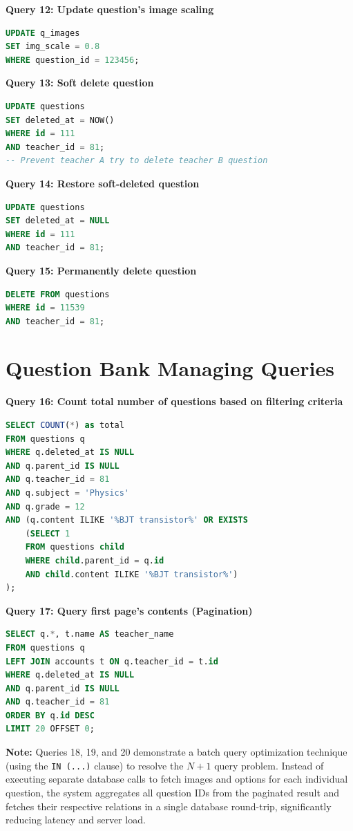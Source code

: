 \documentclass[../report_main.tex]{subfiles}
\begin{document}
\textbf{Query 12: Update question's image scaling}
\begin{lstlisting}[language=SQL]
UPDATE q_images 
SET img_scale = 0.8 
WHERE question_id = 123456;
\end{lstlisting}

\textbf{Query 13: Soft delete question}
\begin{lstlisting}[language=SQL]
UPDATE questions 
SET deleted_at = NOW() 
WHERE id = 111 
AND teacher_id = 81; 
-- Prevent teacher A try to delete teacher B question
\end{lstlisting}

\textbf{Query 14: Restore soft-deleted question}
\begin{lstlisting}[language=SQL]
UPDATE questions 
SET deleted_at = NULL 
WHERE id = 111 
AND teacher_id = 81;
\end{lstlisting}

\textbf{Query 15: Permanently delete question}
\begin{lstlisting}[language=SQL]
DELETE FROM questions 
WHERE id = 11539 
AND teacher_id = 81;
\end{lstlisting}


\section{Question Bank Managing Queries}

\textbf{Query 16: Count total number of questions based on filtering criteria}
\begin{lstlisting}[language=SQL]
SELECT COUNT(*) as total 
FROM questions q 
WHERE q.deleted_at IS NULL 
AND q.parent_id IS NULL 
AND q.teacher_id = 81 
AND q.subject = 'Physics' 
AND q.grade = 12 
AND (q.content ILIKE '%BJT transistor%' OR EXISTS 
    (SELECT 1 
    FROM questions child 
    WHERE child.parent_id = q.id 
    AND child.content ILIKE '%BJT transistor%')
);
\end{lstlisting}

\textbf{Query 17: Query first page's contents (Pagination)}
\begin{lstlisting}[language=SQL]
SELECT q.*, t.name AS teacher_name
FROM questions q
LEFT JOIN accounts t ON q.teacher_id = t.id
WHERE q.deleted_at IS NULL 
AND q.parent_id IS NULL 
AND q.teacher_id = 81
ORDER BY q.id DESC 
LIMIT 20 OFFSET 0;
\end{lstlisting}

\textbf{Note:} Queries 18, 19, and 20 demonstrate a batch query optimization technique (using the \texttt{IN (...)} clause) to resolve the $N+1$ query problem. Instead of executing separate database calls to fetch images and options for each individual question, the system aggregates all question IDs from the paginated result and fetches their respective relations in a single database round-trip, significantly reducing latency and server load.
\end{document}
